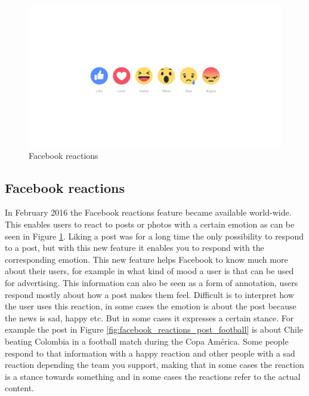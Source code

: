 \documentclass[
10pt, %
a4paper, %
oneside, %
headinclude,footinclude, %
BCOR5mm, %
]{scrartcl}
\begin{document}
\begin{figure}[hbt]
  \includegraphics[width=\linewidth]{reactions-image-en_us.png}
  \caption{Facebook reactions}
  \label{fig:facebook_reactions}
\end{figure}

\subsection{Facebook reactions}
In February 2016 the Facebook reactions feature became available world-wide. This enables users to react to posts or photos with a certain emotion as can be seen in Figure \ref{fig:facebook_reactions}. Liking a post was for a long time the only possibility to respond to a post, but with this new feature it enables you to respond with the corresponding emotion. This new feature helps Facebook to know much more about their users, for example in what kind of mood a user is that can be used for advertising. \cite{wired} This information can also be seen as a form of annotation, users respond mostly about how a post makes them feel. Difficult is to interpret how the user uses this reaction, in some cases the emotion is about the post because the news is sad, happy etc. But in some cases it expresses a certain stance. For example the post in Figure \ref{fig:facebook_reactions_post_football} is about Chile beating Colombia in a football match during the Copa América. Some people respond to that information with a happy reaction and other people with a sad reaction depending the team you support, making that in some cases the reaction is a stance towards something and in some cases the reactions refer to the actual content.
\end{document}
